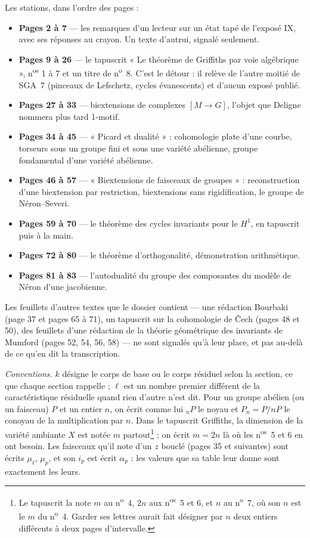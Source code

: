 \documentclass[11pt,a4paper]{article}
\begin{document}
Les stations, dans l'ordre des pages :
\begin{itemize}
\item \textbf{Pages 2 à 7} --- les remarques d'un lecteur sur un état tapé de
l'exposé IX, avec ses réponses au crayon. Un texte d'autrui, signalé seulement.
\item \textbf{Pages 9 à 26} --- le tapuscrit « Le théorème de Griffiths par voie
algébrique », n\textsuperscript{os} 1 à 7 et un titre de n\textsuperscript{o}~8.
C'est le détour : il relève de l'autre moitié de SGA~7 (pinceaux de Lefschetz,
cycles évanescents) et d'aucun exposé publié.
\item \textbf{Pages 27 à 33} --- biextensions de complexes $[M \to G]$, l'objet
que Deligne nommera plus tard 1-motif.
\item \textbf{Pages 34 à 45} --- « Picard et dualité » : cohomologie plate d'une
courbe, torseurs sous un groupe fini et sous une variété abélienne, groupe
fondamental d'une variété abélienne.
\item \textbf{Pages 46 à 57} --- « Biextensions de faisceaux de groupes » :
reconstruction d'une biextension par restriction, biextensions sans
rigidification, le groupe de Néron--Severi.
\item \textbf{Pages 59 à 70} --- le théorème des cycles invariants pour le
$H^1$, en tapuscrit puis à la main.
\item \textbf{Pages 72 à 80} --- le théorème d'orthogonalité, démonstration
arithmétique.
\item \textbf{Pages 81 à 83} --- l'autodualité du groupe des composantes du
modèle de Néron d'une jacobienne.
\end{itemize}
Les feuillets d'autres textes que le dossier contient --- une rédaction Bourbaki
(page 37 et pages 65 à 71), un tapuscrit sur la cohomologie de Čech (pages 48 et
50), des feuillets d'une rédaction de la théorie géométrique des invariants de
Mumford (pages 52, 54, 56, 58) --- ne sont signalés qu'à leur place, et pas
au-delà de ce qu'en dit la transcription.

\emph{Conventions.} $k$ désigne le corps de base ou le corps résiduel selon la
section, ce que chaque section rappelle ; $\ell$ est un nombre premier
différent de la caractéristique résiduelle quand rien d'autre n'est dit. Pour un
groupe abélien (ou un faisceau) $P$ et un entier $n$, on écrit comme lui
${}_nP$ le noyau et $P_n = P/nP$ le conoyau de la multiplication par $n$. Dans
le tapuscrit Griffiths, la dimension de la variété ambiante $X$ est notée $m$
partout\footnote{Le tapuscrit la note $m$ au n\textsuperscript{o}~4, $2n$ aux
n\textsuperscript{os}~5 et 6, et $n$ au n\textsuperscript{o}~7, où son $n$ est le
$m$ du n\textsuperscript{o}~4. Garder ses lettres aurait fait désigner par $n$
deux entiers différents à deux pages d'intervalle.} ; on écrit $m = 2n$ là où les
n\textsuperscript{os}~5 et 6 en ont besoin. Les faisceaux qu'il note d'un $z$
bouclé (pages 35 et suivantes) sont écrits $\mu_\ell$, $\mu_p$, et son $i_p$
est écrit $\alpha_p$ : les valeurs que sa table leur donne sont exactement les
leurs.
\end{document}
